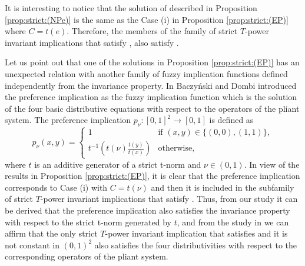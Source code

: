 \begin{remark}\label{remark:(NPe)}
	It is interesting to notice that the solution of \NPe described in Proposition \ref{prop:strict:(NPe)} is the same as the Case (i) in Proposition \ref{prop:strict:(EP)} where $C=t(e)$. Therefore, the members of the family of strict $T$-power invariant implications that satisfy \NPe, also satisfy \EP.
\end{remark}
\begin{remark}\label{remark:preferenceimplication}
	Let us point out that one of the solutions in Proposition \ref{prop:strict:(EP)} has an unexpected relation with another family of fuzzy implication functions defined independently from the invariance property. In \cite{Baczynski2020B} Baczy\'{n}ski and Dombi introduced the preference implication as the fuzzy implication function which is the solution of the four basic distributive equations with respect to the operators of the pliant system. The preference implication $p_{\nu}:[0,1]^2 \to [0,1]$ is defined as
	$$
	p_{\nu}(x,y) =
	\left\{ \begin{array}{ll}
		1 &   \text{if }  (x,y) \in \{(0,0),(1,1)\}, \\[5pt]
		t^{-1}\left(t(\nu)\frac{t(y)}{t(x)}\right) & \text{otherwise},
	\end{array}
	\right.
	$$
	where $t$ is an additive generator of a strict t-norm and $\nu \in (0,1)$. In view of the results in Proposition \ref{prop:strict:(EP)}, it is clear that the preference implication corresponds to Case (i) with $C=t(\nu)$ and then it is included in the subfamily of strict $T$-power invariant implications that satisfy \EP. Thus, from our study it can be derived that the preference implication also satisfies the invariance property with respect to the strict t-norm generated by $t$, and from the study in \cite{Baczynski2020B} we can affirm that the only strict $T$-power invariant implication that satisfies \EP and it is not constant in $(0,1)^2$ also satisfies the four distributivities with respect to the corresponding operators of the pliant system.
\end{remark}

